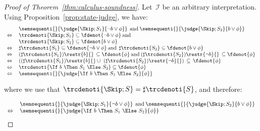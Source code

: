 \documentclass[a4paper,numberwithinsect]{lipics-v2021}
\begin{document}
\begin{proof}[Proof of Theorem~\ref{thm:calculus-soundness}]
  Let~$\mathcal{I}$ be an arbitrary interpretation.
  Using Proposition~\ref{prop:state-judge}, we have: 
  \[
    \begin{array}{ll}
      & 
        \semsequenti{}{\judge{\Skip; S_1}{\lnot b \lor \phi}} \>\>\text{and}\>
        \semsequenti{}{\judge{\Skip; S_2}{b \lor \phi}} \\
      \Leftrightarrow\> & 
                          \trcdenoti{\Skip; S_1} \subseteq \fdenot{\lnot b \lor \phi}
                          \>\text{and}\>\\
      &
        \trcdenoti{\Skip; S_2} \subseteq \fdenot{b \lor \phi}  \\
      \Leftrightarrow & 
                        \sharp \trcdenoti{S_1} \subseteq \fdenot{\lnot b \lor \phi} 
                        \>\text{and}\>\>
                        \sharp \trcdenoti{S_2} \subseteq \fdenot{b \lor \phi}  \\
      \Leftrightarrow & 
                        (\sharp \trcdenoti{S_1}) \restr{b}{} \,\subseteq \fdenot{\phi}
                        \>\text{and}\>
                        (\sharp \trcdenoti{S_2}) \restr{\lnot b}{} \,\subseteq \fdenot{\phi} \\
      \Leftrightarrow & 
                        \left((\sharp \trcdenoti{S_1}) \restr{b}{} \cup\
                        (\sharp \trcdenoti{S_2}) \restr{\lnot b}{}\right)
                        \,\subseteq\,
                        \fdenot{\phi}  \\
      \Leftrightarrow\> & 
                          \trcdenoti{\If\ b\ \Then\ S_1\ \Else\ S_2} \subseteq \fdenot{\phi} \\
      \Leftrightarrow & 
                        \semsequenti{}{\judge{\If\ b\ \Then\ S_1\ \Else\ S_2}{\phi}} 
    \end{array}
  \]

  \noindent
  where we use that
  $\trcdenoti{\Skip; S} = \sharp \trcdenoti{S}$, and therefore:

  \[
    \begin{array}{ll}
     & \semsequenti{}{\judge{\Skip; S_1}{\lnot b \lor \phi}} \>\>\text{and}\>
      \semsequenti{}{\judge{\Skip; S_2}{b \lor \phi}}\\
  \Leftrightarrow\> & 
      \semsequenti{}{\judge{\If\ b\ \Then\ S_1\ \Else\ S_2}{\phi}}
    \end{array}
  \]


\end{proof}
\end{document}
